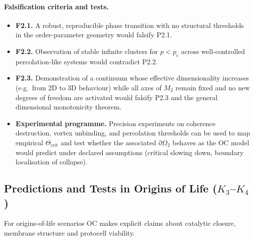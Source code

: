 \paragraph{Falsification criteria and tests.}
\begin{itemize}
  \item \textbf{F2.1.}
        A robust, reproducible phase transition with no structural
        thresholds in the order-parameter geometry would falsify P2.1.
  \item \textbf{F2.2.}
        Observation of stable infinite clusters for \(p<p_c\) across
        well-controlled percolation-like systems would contradict P2.2.
  \item \textbf{F2.3.}
        Demonstration of a continuum whose effective dimensionality increases
        (e.g.\ from 2D to 3D behaviour) while all axes of \(M_2\) remain
        fixed and no new degrees of freedom are activated would falsify
        P2.3 and the general dimensional monotonicity theorem.
  \item \textbf{Experimental programme.}
        Precision experiments on coherence destruction, vortex unbinding,
        and percolation thresholds can be used to map empirical
        \(\Theta_{\mathrm{crit}}\) and test whether the associated
        \(\partial\Omega_2\) behaves as the OC model would predict under declared assumptions (critical slowing down,
        boundary localisation of collapse).
\end{itemize}

\subsection{Predictions and Tests in Origins of Life
            (\texorpdfstring{$K_3$}{K\_3}--\texorpdfstring{$K_4$}{K\_4})}

For origins-of-life scenarios OC makes explicit claims about catalytic
closure, membrane structure and protocell viability.


